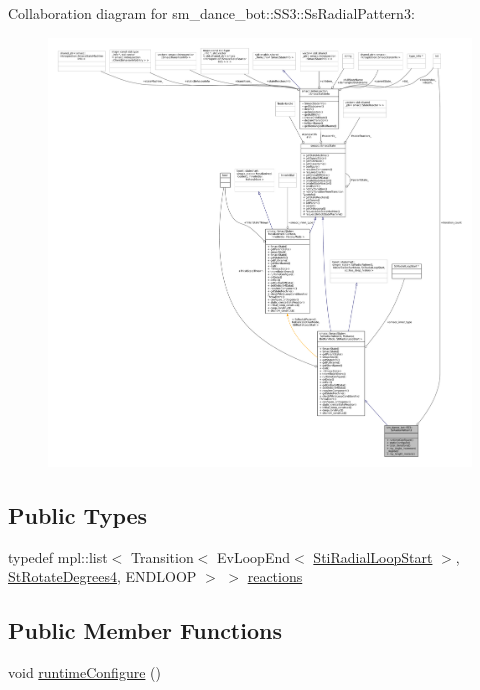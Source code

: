 Collaboration diagram for sm\+\_\+dance\+\_\+bot\+:\+:S\+S3\+:\+:Ss\+Radial\+Pattern3\+:
\nopagebreak
\begin{figure}[H]
\begin{center}
\leavevmode
\includegraphics[width=350pt]{structsm__dance__bot_1_1SS3_1_1SsRadialPattern3__coll__graph}
\end{center}
\end{figure}
\subsection*{Public Types}
\begin{DoxyCompactItemize}
\item 
typedef mpl\+::list$<$ Transition$<$ Ev\+Loop\+End$<$ \hyperlink{structsm__dance__bot_1_1radial__motion__states_1_1StiRadialLoopStart}{Sti\+Radial\+Loop\+Start} $>$, \hyperlink{structsm__dance__bot_1_1StRotateDegrees4}{St\+Rotate\+Degrees4}, E\+N\+D\+L\+O\+OP $>$ $>$ \hyperlink{structsm__dance__bot_1_1SS3_1_1SsRadialPattern3_aa427cf1c1d77bc04e23acf4fb4bef9f1}{reactions}
\end{DoxyCompactItemize}
\subsection*{Public Member Functions}
\begin{DoxyCompactItemize}
\item 
void \hyperlink{structsm__dance__bot_1_1SS3_1_1SsRadialPattern3_aa470f8f74c73af4e98a4c151b3a19f97}{runtime\+Configure} ()
\end{DoxyCompactItemize}
